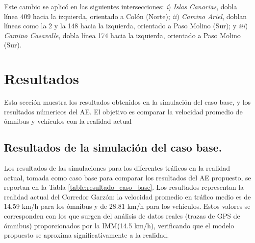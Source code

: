Este cambio se aplicó en las siguientes intersecciones: \emph{i}) \emph{Islas Canarias}, dobla línea 409 hacia la izquierda, orientado a Colón (Norte); \emph{ii}) \emph{Camino Ariel}, doblan líneas como la  2 y la 148 hacia la izquierda, orientado a Paso Molino (Sur); y \emph{iii}) \emph{Camino Casavalle}, dobla línea 174 hacia la izquierda, orientado a Paso Molino (Sur).


\section{Resultados}
Esta sección muestra los resultados obtenidos en la simulación del caso base, y los resultados númericos del AE. El objetivo es comparar la velocidad promedio de ómnibus y vehículos con la realidad actual 



\subsection{Resultados de la simulación del caso base.}

Los resultados de las simulaciones para los diferentes tráficos en la realidad actual, tomada como caso base para comparar los resultados del AE propuesto, se reportan en la Tabla \ref{table:resultado_caso_base}. Los resultados representan la realidad actual del Corredor Garzón: la velocidad promedio en tráfico medio es de 14.59 km/h para los ómnibus y de 28.81 km/h para los vehiculos. Estos valores se corresponden con los que surgen del análisis de datos reales (trazas de GPS de ómnibus) proporcionados por la IMM(14.5 km/h), verificando que el modelo propuesto se aproxima significativamente a la realidad.

 

